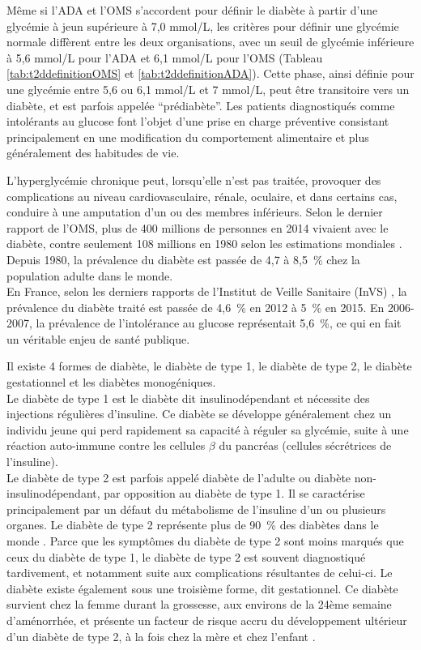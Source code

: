 \documentclass[11pt,a4paper,notrimn]{krantz}
\theoremstyle{definition}
\theoremstyle{definition}
\theoremstyle{remark}
\begin{document}
Même si l'ADA et l'OMS s'accordent pour définir le diabète à partir
d'une glycémie à jeun supérieure à 7,0 mmol/L, les critères pour définir
une glycémie normale diffèrent entre les deux organisations, avec un
seuil de glycémie inférieure à 5,6 mmol/L pour l'ADA et 6,1 mmol/L pour
l'OMS (Tableau \ref{tab:t2ddefinitionOMS} et
\ref{tab:t2ddefinitionADA}). Cette phase, ainsi définie pour une
glycémie entre 5,6 ou 6,1 mmol/L et 7 mmol/L, peut être transitoire vers
un diabète, et est parfois appelée ``prédiabète''. Les patients
diagnostiqués comme intolérants au glucose font l'objet d'une prise en
charge préventive consistant principalement en une modification du
comportement alimentaire et plus généralement des habitudes de vie.

L'hyperglycémie chronique peut, lorsqu'elle n'est pas traitée, provoquer
des complications au niveau cardiovasculaire, rénale, oculaire, et dans
certains cas, conduire à une amputation d'un ou des membres inférieurs.
Selon le dernier rapport de l'OMS, plus de 400 millions de personnes en
2014 vivaient avec le diabète, contre seulement 108 millions en 1980
selon les estimations mondiales \citep{roglic_global_2016}. Depuis 1980,
la prévalence du diabète est passée de 4,7 à 8,5~\% chez la population
adulte dans le monde.\\
En France, selon les derniers rapports de l'Institut de Veille Sanitaire
(InVS) \citep{mandereau-bruno_prevalence_2014, ricci_diabete_2010}, la
prévalence du diabète traité est passée de 4,6~\% en 2012 à 5~\% en
2015. En 2006-2007, la prévalence de l'intolérance au glucose
représentait 5,6~\%, ce qui en fait un véritable enjeu de santé
publique.

Il existe 4 formes de diabète, le diabète de type 1, le diabète de type
2, le diabète gestationnel et les diabètes monogéniques.\\
Le diabète de type 1 est le diabète dit insulinodépendant et nécessite
des injections régulières d'insuline. Ce diabète se développe
généralement chez un individu jeune qui perd rapidement sa capacité à
réguler sa glycémie, suite à une réaction auto-immune contre les
cellules \(\beta\) du pancréas (cellules sécrétrices de l'insuline).\\
Le diabète de type 2 est parfois appelé diabète de l'adulte ou diabète
non-insulinodépendant, par opposition au diabète de type 1. Il se
caractérise principalement par un défaut du métabolisme de l'insuline
d'un ou plusieurs organes. Le diabète de type 2 représente plus de 90~\%
des diabètes dans le monde \citep{lyssenko_genetic_2013}. Parce que les
symptômes du diabète de type 2 sont moins marqués que ceux du diabète de
type 1, le diabète de type 2 est souvent diagnostiqué tardivement, et
notamment suite aux complications résultantes de celui-ci. Le diabète
existe également sous une troisième forme, dit gestationnel. Ce diabète
survient chez la femme durant la grossesse, aux environs de la 24ème
semaine d'aménorrhée, et présente un facteur de risque accru du
développement ultérieur d'un diabète de type 2, à la fois chez la mère
et chez l'enfant \citep{case_preventing_2006, roglic_global_2016}.
\end{document}
